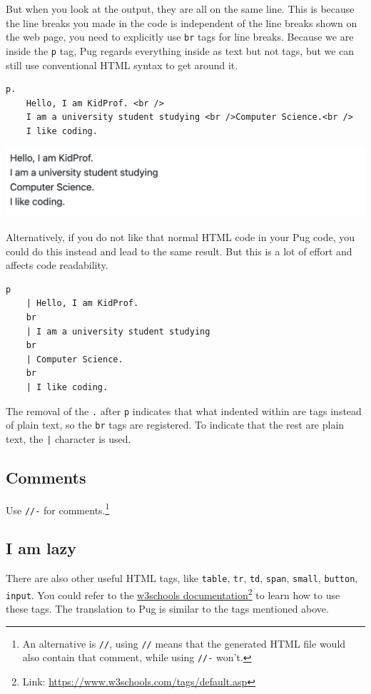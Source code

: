 But when you look at the output, they are all on the same line. This is because the line breaks you made in the code is independent of the line breaks shown on the web page, you need to explicitly use \texttt{br} tags for line breaks. Because we are inside the \texttt{p} tag, Pug regards everything inside as text but not tags, but we can still use conventional HTML syntax to get around it.

\begin{lstlisting}[language=pug]
p.
	Hello, I am KidProf. <br />
	I am a university student studying <br />Computer Science.<br />
	I like coding.
\end{lstlisting}

\includegraphics[width=15cm]{images/ch5-textmultiplelines.png}

Alternatively, if you do not like that normal HTML code in your Pug code, you could do this instead and lead to the same result. But this is a lot of effort and affects code readability.

\begin{lstlisting}[language=pug]
p
	| Hello, I am KidProf.
	br
	| I am a university student studying
	br
	| Computer Science.
	br
	| I like coding.
\end{lstlisting}

The removal of the \texttt{.} after \texttt{p} indicates that what indented within are tags instead of plain text, so the \texttt{br} tags are registered. To indicate that the rest are plain text, the \texttt{|} character is used.

\subsection{Comments}

Use \texttt{//-} for comments.\footnote{An alternative is \texttt{//}, using \texttt{//} means that the generated HTML file would also contain that comment, while using \texttt{//-} won't.}

\subsection{I am lazy}
There are also other useful HTML tags, like \texttt{table}, \texttt{tr}, \texttt{td}, \texttt{span}, \texttt{small}, \texttt{button}, \texttt{input}. You could refer to the \href{https://www.w3schools.com/tags/default.asp}{w3schools documentation}\footnote{Link: \url{https://www.w3schools.com/tags/default.asp}} to learn how to use these tags. The translation to Pug is similar to the tags mentioned above.

